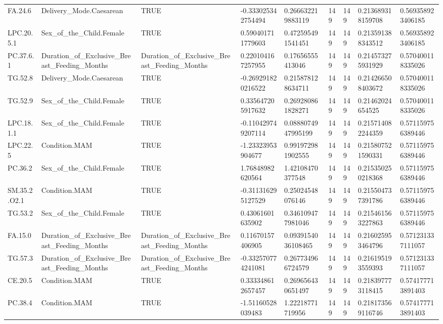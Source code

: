 \begin{longtable}{lllllllll}
FA.24.6 & Delivery\_Mode.Caesarean & TRUE & -0.333025342754494 & 0.266632219883119 & 149 & 149 & 0.213689318159708 & 0.569358923406185 \\
LPC.20.5.1 & Sex\_of\_the\_Child.Female & TRUE & 0.590401711779603 & 0.472595491541451 & 149 & 149 & 0.213591388343512 & 0.569358923406185 \\
PC.37.6.1 & Duration\_of\_Exclusive\_Breast\_Feeding\_Months & Duration\_of\_Exclusive\_Breast\_Feeding\_Months & 0.220104167257955 & 0.17656555413046 & 149 & 149 & 0.214573275931929 & 0.570400118335026 \\
TG.52.8 & Delivery\_Mode.Caesarean & TRUE & -0.269291820216522 & 0.215878128634711 & 149 & 149 & 0.214266508403672 & 0.570400118335026 \\
TG.52.9 & Sex\_of\_the\_Child.Female & TRUE & 0.335647205917632 & 0.269280861828271 & 149 & 149 & 0.21462024654525 & 0.570400118335026 \\
LPC.18.1.1 & Sex\_of\_the\_Child.Female & TRUE & -0.110429749207114 & 0.0888074947995199 & 149 & 149 & 0.215714082244359 & 0.571159756389446 \\
LPC.22.5 & Condition.MAM & TRUE & -1.23323953904677 & 0.991972981902555 & 149 & 149 & 0.215807521590331 & 0.571159756389446 \\
PC.36.2 & Sex\_of\_the\_Child.Female & TRUE & 1.76848982620564 & 1.42108470377548 & 149 & 149 & 0.215350250218368 & 0.571159756389446 \\
SM.35.2.O2.1 & Condition.MAM & TRUE & -0.311316295127529 & 0.25024548076146 & 149 & 149 & 0.215504737391786 & 0.571159756389446 \\
TG.53.2 & Sex\_of\_the\_Child.Female & TRUE & 0.43061601635902 & 0.346109477981046 & 149 & 149 & 0.215461563227863 & 0.571159756389446 \\
FA.15.0 & Duration\_of\_Exclusive\_Breast\_Feeding\_Months & Duration\_of\_Exclusive\_Breast\_Feeding\_Months & 0.11670157406905 & 0.0939154036108465 & 149 & 149 & 0.216025953464796 & 0.571231337111057 \\
TG.57.3 & Duration\_of\_Exclusive\_Breast\_Feeding\_Months & Duration\_of\_Exclusive\_Breast\_Feeding\_Months & -0.332570774241081 & 0.267734966724579 & 149 & 149 & 0.216195193559393 & 0.571231337111057 \\
CE.20.5 & Condition.MAM & TRUE & 0.333348612657457 & 0.269656430651497 & 149 & 149 & 0.218397773118415 & 0.574177713891403 \\
PC.38.4 & Condition.MAM & TRUE & -1.51160528039483 & 1.22218771719956 & 149 & 149 & 0.218173569116746 & 0.574177713891403 \\

\end{longtable}
